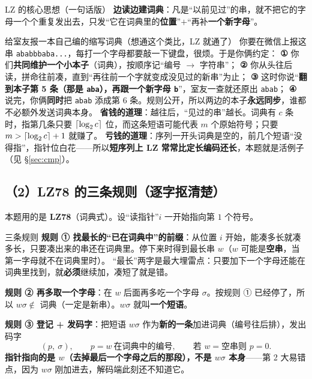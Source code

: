 \documentclass[11pt,a4paper]{ctexart}
\begin{document}
\begin{defbox}{LZ 的核心思想（一句话版）}
\textbf{边读边建词典}：凡是“以前见过”的串，就不把它的字母一个个重复发出去，只发“它在词典里的\textbf{位置}”$+$“再补\textbf{一个新字母}”。
\end{defbox}

\begin{idea}{给室友报一本自己编的缩写词典（想通这个类比，LZ 就通了）}
你要在微信上报这串 \texttt{ababbbaba...}，每打一个字母都要敲一下键盘，很烦。于是你俩约定：
\textbf{①} 你们\textbf{共同维护一个小本子}（词典），按顺序记“编号 $\to$ 字符串”；
\textbf{②} 你从头往后读，拼命往前凑，直到“再往前一个字就变成没见过的新串”为止；
\textbf{③} 这时你说“\textbf{翻到本子第 5 条（那是 \texttt{aba}），再跟一个新字母 \texttt b}”，室友一查就还原出 \texttt{abab}；
\textbf{④} 说完，你俩\textbf{同时}把 \texttt{abab} 添成第 6 条。规则公开，所以两边的本子\textbf{永远同步}，谁都不必额外发送词典本身。
\textbf{省钱的道理}：越往后，“见过的串”越长。词典有 $c$ 条时，指第几条只要 $\lceil\log_{2} c\rceil$ 位，而这条短语可能代表 $m$ 个原始符号；只要 $m>\lceil\log_{2} c\rceil+1$ 就赚了。
\textbf{亏钱的道理}：序列一开头词典是空的，前几个短语“没得指”，指针位白花——所以\textbf{短序列上 LZ 常常比定长编码还长}，本题就是活例子（见 \S\ref{sec:cmp}）。
\end{idea}

\subsection{（2）LZ78 的三条规则（逐字抠清楚）}

本题用的是 \textbf{LZ78}（词典式）。设“读指针”$i$ 一开始指向第 $1$ 个符号。

\begin{defbox}{三条规则}
\textbf{规则 ① 找最长的“已在词典中”的前缀}：从位置 $i$ 开始，能凑多长就凑多长，只要凑出来的串还在词典里。停下来时得到最长串 $w$（$w$ 可能是\textbf{空串}，当第一字母就不在词典里时）。
“最长”两字是最大埋雷点：只要加下一个字母还能在词典里找到，就\textbf{必须}继续加，凑短了就是错。

\textbf{规则 ② 再多取一个字母}：在 $w$ 后面再多吃一个字母 $\sigma$。按规则 ① 已经停了，所以 $w\sigma\notin$ 词典（一定是新串）。$w\sigma$ 就叫\textbf{一个短语}。

\textbf{规则 ③ 登记 + 发码字}：把短语 $w\sigma$ 作为\textbf{新的一条}加进词典（编号往后排），发出码字
\[
(p,\ \sigma),\qquad p=w\ \text{在词典中的编号},\qquad \text{若 }w=\text{空串则 }p=0 .
\]
\textbf{指针指向的是 $w$（去掉最后一个字母之后的那段），不是 $w\sigma$ 本身}——第 2 大易错点，因为 $w\sigma$ 刚加进去，解码端此刻还不知道它。
\end{defbox}
\end{document}
